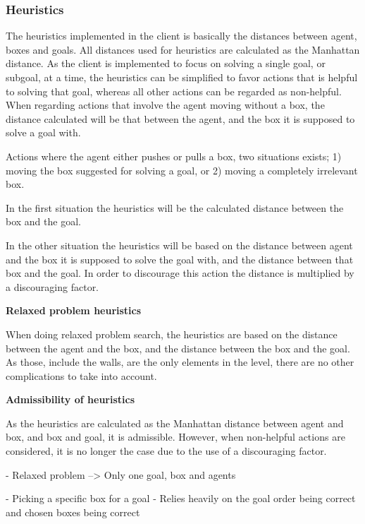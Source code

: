 \documentclass[Main]{subfiles}
\begin{document}
\subsubsection{Heuristics}
\label{sec:method_heuristics}
The heuristics implemented in the client is basically the distances between agent, boxes and goals. All distances used for heuristics are calculated as the Manhattan distance.  As the client is implemented to focus on solving a single goal, or subgoal, at a time, the heuristics can be simplified to favor actions that is helpful to solving that goal, whereas all other actions can be regarded as non-helpful. 
When regarding actions that involve the agent moving without a box, the distance calculated will be that between the agent, and the box it is supposed to solve a goal with. 

Actions where the agent either pushes or pulls a box, two situations exists; 1) moving the box suggested for solving a goal, or 2) moving a completely irrelevant box. 

In the first situation the heuristics will be the calculated distance between the box and the goal.

In the other situation the heuristics will be based on the distance between agent and the box it is supposed to solve the goal with, and the distance between that box and the goal. In order to discourage this action the distance is multiplied by a discouraging factor.


\textbf{Relaxed problem heuristics}

When doing relaxed problem search, the heuristics are based on the distance between the agent and the box, and the distance between the box and the goal. As those, include the walls, are the only elements in the level, there are no other complications to take into account. 



\textbf{Admissibility of heuristics}

As the heuristics are calculated as the Manhattan distance between agent and box, and box and goal, it is admissible. However, when non-helpful actions are considered, it is no longer the case due to the use of a discouraging factor. 


- Relaxed problem --> Only one goal, box and agents

- Picking a specific box for a goal
- Relies heavily on the goal order being correct and chosen boxes being correct
\end{document}
